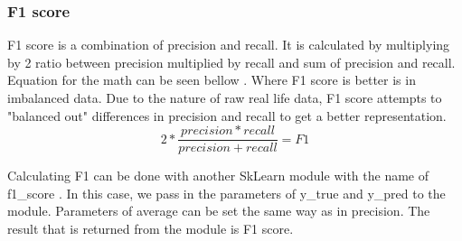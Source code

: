 \subsubsection{F1 score}
F1 score is a combination of precision and recall. It is calculated by multiplying by 2 ratio between precision multiplied by recall and sum of precision and recall. Equation for the math can be seen bellow \parencite{lipton2014optimal}. Where F1 score is better is in imbalanced data. Due to the nature of raw real life data, F1 score attempts to "balanced out" differences in precision and recall to get a better representation.
\[2 * \frac{precision * recall}{precision + recall} = F1 \]

Calculating F1 can be done with another SkLearn module with the name of f1{\_}score \parencite{web:F1Score}. In this case, we pass in the parameters of y{\_}true and y{\_}pred to the module. Parameters of average can be set the same way as in precision. The result that is returned from the module is F1 score.